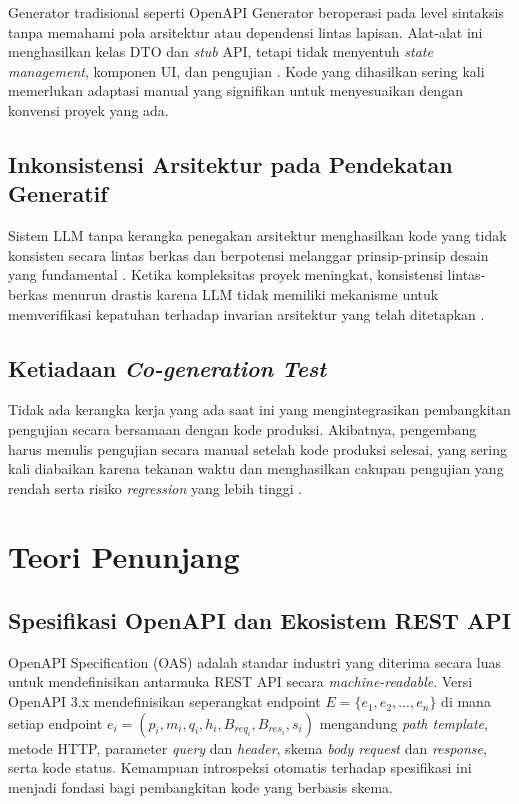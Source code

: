 Generator tradisional seperti OpenAPI Generator beroperasi pada level sintaksis tanpa memahami pola arsitektur atau dependensi lintas lapisan. Alat-alat ini menghasilkan kelas DTO dan \textit{stub} API, tetapi tidak menyentuh \textit{state management}, komponen UI, dan pengujian \cite{openapitools2026}. Kode yang dihasilkan sering kali memerlukan adaptasi manual yang signifikan untuk menyesuaikan dengan konvensi proyek yang ada.

\subsection{Inkonsistensi Arsitektur pada Pendekatan Generatif}

Sistem LLM tanpa kerangka penegakan arsitektur menghasilkan kode yang tidak konsisten secara lintas berkas dan berpotensi melanggar prinsip-prinsip desain yang fundamental \cite{ying2025}. Ketika kompleksitas proyek meningkat, konsistensi lintas-berkas menurun drastis karena LLM tidak memiliki mekanisme untuk memverifikasi kepatuhan terhadap invarian arsitektur yang telah ditetapkan \cite{ghorbani2024}.

\subsection{Ketiadaan \textit{Co-generation Test}}

Tidak ada kerangka kerja yang ada saat ini yang mengintegrasikan pembangkitan pengujian secara bersamaan dengan kode produksi. Akibatnya, pengembang harus menulis pengujian secara manual setelah kode produksi selesai, yang sering kali diabaikan karena tekanan waktu dan menghasilkan cakupan pengujian yang rendah serta risiko \textit{regression} yang lebih tinggi \cite{haque2025}.

\section{Teori Penunjang}

\subsection{Spesifikasi OpenAPI dan Ekosistem REST API}

OpenAPI Specification (OAS) adalah standar industri yang diterima secara luas untuk mendefinisikan antarmuka REST API secara \textit{machine-readable}. Versi OpenAPI 3.x mendefinisikan seperangkat endpoint $E = \{e_1, e_2, ..., e_n\}$ di mana setiap endpoint $e_i = (p_i, m_i, q_i, h_i, B_{req_i}, B_{res_i}, s_i)$ mengandung \textit{path template}, metode HTTP, parameter \textit{query} dan \textit{header}, skema \textit{body request} dan \textit{response}, serta kode status. Kemampuan introspeksi otomatis terhadap spesifikasi ini menjadi fondasi bagi pembangkitan kode yang berbasis skema.

